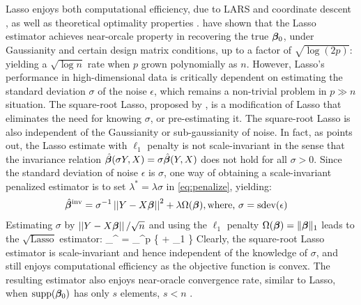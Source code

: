 \documentclass[12pt]{article}
\begin{document}
Lasso enjoys both computational efficiency, due to LARS \citep{efron_least_2004} and coordinate descent \citep{friedman_pathwise_2007}, as well as theoretical optimality properties \citep{buhlmann2011statistics}. \citet{bickel2009simultaneous} have shown that the Lasso estimator achieves near-orcale property in recovering the true $\boldsymbol{\beta}_0$, under Gaussianity and certain design matrix conditions, up to a factor of $\sqrt{\log( 2 p)}$: yielding a $\sqrt{\log n}$ rate when $p$ grown polynomially as $n$. However, Lasso's performance in high-dimensional data is critically dependent on estimating the standard deviation $\sigma$ of the noise $\epsilon$, which remains a non-trivial problem in $p \gg n$ situation. The square-root Lasso, proposed by \cite{belloni2011square}, is a modification of Lasso that eliminates the need for knowing $\sigma$, or pre-estimating it. The square-root Lasso is also independent of the Gaussianity or sub-gaussianity of noise. In fact, as \citet{giraud2014introduction} points out, the Lasso estimate with $\ell_1$ penalty is not scale-invariant in the sense that the invariance relation $\hat{\boldsymbol{\beta}}(\sigma Y, X) = \sigma \hat{\boldsymbol{\beta}}(Y, X)$ does not hold for all $\sigma > 0$. Since the standard deviation of noise $\epsilon$ is $\sigma$, one way of obtaining a scale-invariant penalized estimator is to set $\lambda^* = \lambda \sigma$ in \eqref{eq:penalize}, yielding:
\begin{align}
\hat{\boldsymbol{\beta}}^{\text{inv}} & = \sigma^{-1} \left|\left|Y - X\boldsymbol{\beta}\right|\right|^2 + \lambda \Omega(\boldsymbol{\beta}), \text{where, } \sigma = \text{sdev}(\epsilon)
\end{align}
Estimating $\sigma$ by $\left|\left|Y-X\boldsymbol{\beta}\right|\right|/\sqrt{n}$ and using the $\ell_1$ penalty $\Omega(\boldsymbol{\beta}) = \lVert\boldsymbol{\beta}\rVert_1$ leads to the $\sqrt{\text{Lasso}}$ estimator: 
\beq
\hat{\bbeta}_{\lambda}^{} = \argmin_{\bbeta \in \Re^p} \{   + \lambda \norm{\bbeta}_1 \} \label{eq:sqlasso}
\eeq
Clearly, the square-root Lasso estimator is scale-invariant and hence independent of the knowledge of $\sigma$, and still enjoys computational efficiency as the objective function is convex. The resulting estimator also enjoys near-oracle convergence rate, similar to Lasso, when $\text{supp}(\boldsymbol{\beta}_0)$ has only $s$ elements, $s < n$ \citep{belloni2011square}. 
\end{document}
